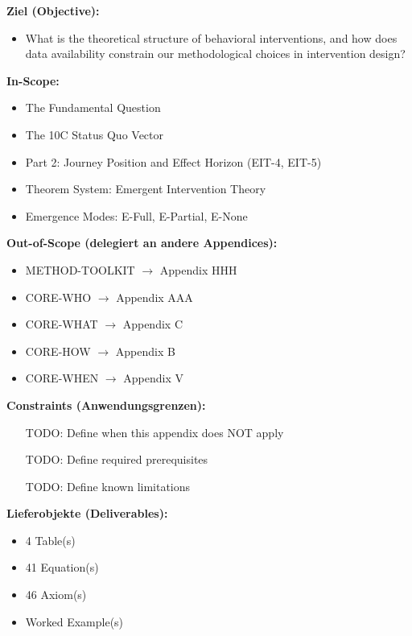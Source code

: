 
\begin{tcolorbox}[
    colback=orange!5!white,
    colframe=orange!75!black,
    title={\textbf{Appendix Scope: Ziel / In-Scope / Out-of-Scope / Constraints}},
    fonttitle=\bfseries
]

\textbf{Ziel (Objective):}
\begin{itemize}[nosep]
    \item What is the theoretical structure of behavioral interventions, and how does data availability constrain our methodological choices in intervention design?
\end{itemize}

\textbf{In-Scope:}
\begin{itemize}[nosep]
    \item The Fundamental Question
    \item The 10C Status Quo Vector
    \item Part 2: Journey Position and Effect Horizon (EIT-4, EIT-5)
    \item Theorem System: Emergent Intervention Theory
    \item Emergence Modes: E-Full, E-Partial, E-None
\end{itemize}

\textbf{Out-of-Scope (delegiert an andere Appendices):}
\begin{itemize}[nosep]
    \item METHOD-TOOLKIT $\rightarrow$ Appendix HHH
    \item CORE-WHO $\rightarrow$ Appendix AAA
    \item CORE-WHAT $\rightarrow$ Appendix C
    \item CORE-HOW $\rightarrow$ Appendix B
    \item CORE-WHEN $\rightarrow$ Appendix V
\end{itemize}

\textbf{Constraints (Anwendungsgrenzen):}
\begin{itemize}[nosep]
    \item [TODO: Define when this appendix does NOT apply]
    \item [TODO: Define required prerequisites]
    \item [TODO: Define known limitations]
\end{itemize}

\textbf{Lieferobjekte (Deliverables):}
\begin{itemize}[nosep]
    \item 4 Table(s)
    \item 41 Equation(s)
    \item 46 Axiom(s)
    \item Worked Example(s)
\end{itemize}

\end{tcolorbox}


